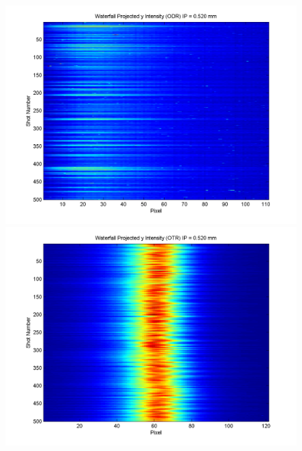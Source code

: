 \documentclass[12pt]{article}
\begin{document}
\begin{figure}
\begin{center}
\includegraphics[scale=0.5]{Figures/ProjY_wfall_ODR_520.PNG}
\includegraphics[scale=0.5]{Figures/ProjY_wfall_OTR_520.PNG}
\caption{}
\end{center}
\end{figure}
\end{document}
